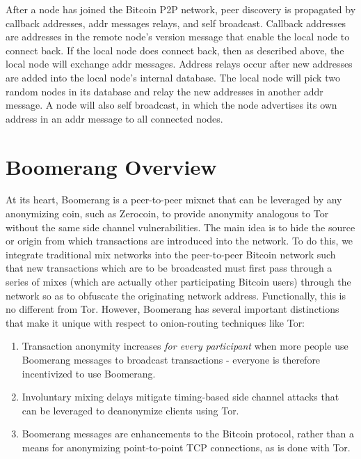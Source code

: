 After a node has joined the Bitcoin P2P network, peer discovery is propagated by callback addresses, addr messages relays, and self broadcast. Callback addresses are addresses in the remote node’s version message that enable the local node to connect back.  If the local node does connect back, then as described above, the local node will exchange addr messages.  Address relays occur after new addresses are added into the local node’s internal database. The local node will pick two random nodes in its database and relay the new addresses in another addr message. A node will also self broadcast, in which the node advertises its own address in an addr message to all connected nodes.

\section{Boomerang Overview}
At its heart, Boomerang is a peer-to-peer mixnet that can be leveraged by any anonymizing coin, such as Zerocoin, to provide anonymity analogous to Tor without the same side channel vulnerabilities. The main idea is to hide the source or origin from which transactions are introduced into the network. To do this, we integrate traditional mix networks into the peer-to-peer Bitcoin network such that new transactions which are to be broadcasted must first pass through a series of mixes (which are actually other participating Bitcoin users) through the network so as to obfuscate the originating network address. Functionally, this is no different from Tor. However, Boomerang has several important distinctions that make it unique with respect to onion-routing techniques like Tor:
\begin{enumerate}
	\item Transaction anonymity increases \emph{for every participant} when more people use Boomerang messages to broadcast transactions - everyone is therefore incentivized to use Boomerang. 
	\item Involuntary mixing delays mitigate timing-based side channel attacks that can be leveraged to deanonymize clients using Tor. 
	\item Boomerang messages are enhancements to the Bitcoin protocol, rather than a means for anonymizing point-to-point TCP connections, as is done with Tor. 
\end{enumerate}

